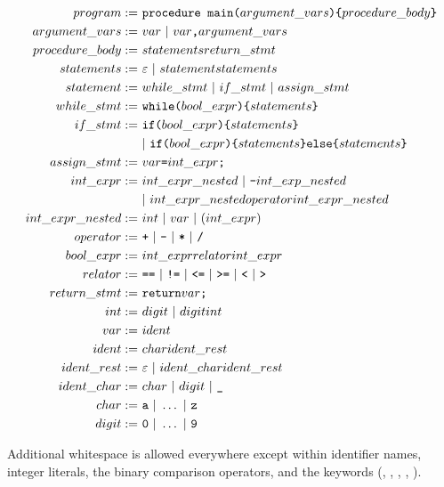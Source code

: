 \documentclass{article}
\newcommand\inParens[1]{\texttt{(}#1\texttt{)}}
\newcommand\inBraces[1]{\texttt{\{}#1\texttt{\}}}
\newcommand\comma{\texttt{,}}
\newcommand\semicolon{\texttt{;}}
\begin{document}
\begin{align*}
program :=& \ \texttt{procedure main}\inParens{argument\_vars} \inBraces{procedure\_body} \\
argument\_vars :=& \ var \ | \ var\comma argument\_vars \\
procedure\_body :=& \ statements\space return\_stmt \\
statements :=& \ \varepsilon \ | \ statement \space statements \\
statement :=& \ while\_stmt \ | \ if\_stmt \ | \ assign\_stmt \\
while\_stmt :=& \ \texttt{while}\inParens{bool\_expr} \inBraces{statements} \\
if\_stmt :=& \ \texttt{if}\inParens{bool\_expr} \inBraces{statements}\\
& \ | \ \texttt{if}\inParens{bool\_expr} \inBraces{statements} \texttt{else}\inBraces{statements} \\
assign\_stmt :=& \ var \texttt{=} int\_expr \semicolon \\
int\_expr :=& \ int\_expr\_nested \ | \ \texttt{-} int\_exp\_nested \\
& \ | \ int\_expr\_nested \space operator \space int\_expr\_nested \\
int\_expr\_nested :=& \ int \ | \ var \ | \ (int\_expr) \\
operator :=& \ \texttt{+} \ | \ \texttt{-} \ | \ \texttt{*} \ | \ \texttt{/} \\
bool\_expr :=& \ int\_expr \space relator \space int\_expr \\
relator :=& \ \texttt{==} \ | \ \texttt{!=} \ | \ \texttt{<=} \ | \ \texttt{>=} \ | \ \texttt{<} \ | \ \texttt{>}\\
return\_stmt :=& \ \texttt{return}\space var \semicolon\\
int :=& \ digit \ | \ digit \space int\\
var :=& \ ident \\
ident :=& \ char \space ident\_rest \\
ident\_rest :=& \ \varepsilon \ | \ ident\_char \space ident\_rest \\
ident\_char :=& \ char \ | \ digit \ | \ \texttt{\_} \\
char :=& \ \texttt{a} \ | \ \ldots \ | \ \texttt{z} \\
digit :=& \ \texttt{0} \ | \ \ldots \ | \ \texttt{9}
\end{align*}

Additional whitespace is allowed everywhere except within identifier names, integer literals, the binary comparison operators, and the keywords (, , , , ).
\end{document}
